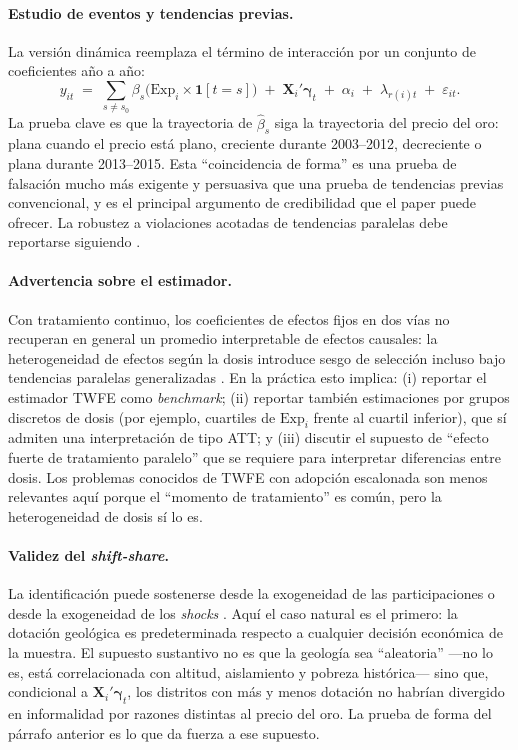\documentclass[11pt,a4paper]{article}
\newcommand{\Exp}{\mathrm{Exp}}
\begin{document}
\paragraph{Estudio de eventos y tendencias previas.} La versión dinámica reemplaza el término de interacción por un conjunto de coeficientes año a año:
\begin{equation}
y_{it} \;=\; \sum_{s \neq s_0} \beta_s \bigl(\Exp_i \times \mathbf{1}[t=s]\bigr) \;+\; \mathbf{X}_i'\boldsymbol{\gamma}_t \;+\; \alpha_i \;+\; \lambda_{r(i)t} \;+\; \varepsilon_{it}.
\label{eq:event}
\end{equation}
La prueba clave es que la trayectoria de $\hat\beta_s$ siga la trayectoria del precio del oro: plana cuando el precio está plano, creciente durante 2003--2012, decreciente o plana durante 2013--2015. Esta ``coincidencia de forma'' es una prueba de falsación mucho más exigente y persuasiva que una prueba de tendencias previas convencional, y es el principal argumento de credibilidad que el paper puede ofrecer. La robustez a violaciones acotadas de tendencias paralelas debe reportarse siguiendo \citet{rambachan2023}.

\paragraph{Advertencia sobre el estimador.} Con tratamiento continuo, los coeficientes de efectos fijos en dos vías no recuperan en general un promedio interpretable de efectos causales: la heterogeneidad de efectos según la dosis introduce sesgo de selección incluso bajo tendencias paralelas generalizadas \citep{callaway2024}. En la práctica esto implica: (i) reportar el estimador TWFE como \emph{benchmark}; (ii) reportar también estimaciones por grupos discretos de dosis (por ejemplo, cuartiles de $\Exp_i$ frente al cuartil inferior), que sí admiten una interpretación de tipo ATT; y (iii) discutir el supuesto de ``efecto fuerte de tratamiento paralelo'' que se requiere para interpretar diferencias entre dosis. Los problemas conocidos de TWFE con adopción escalonada \citep{callaway2021,dechaisemartin2020} son menos relevantes aquí porque el ``momento de tratamiento'' es común, pero la heterogeneidad de dosis sí lo es.

\paragraph{Validez del \emph{shift-share}.} La identificación puede sostenerse desde la exogeneidad de las participaciones o desde la exogeneidad de los \emph{shocks} \citep{goldsmith2020,borusyak2022}. Aquí el caso natural es el primero: la dotación geológica es predeterminada respecto a cualquier decisión económica de la muestra. El supuesto sustantivo no es que la geología sea ``aleatoria'' ---no lo es, está correlacionada con altitud, aislamiento y pobreza histórica--- sino que, condicional a $\mathbf{X}_i'\boldsymbol{\gamma}_t$, los distritos con más y menos dotación no habrían divergido en informalidad por razones distintas al precio del oro. La prueba de forma del párrafo anterior es lo que da fuerza a ese supuesto.
\end{document}
